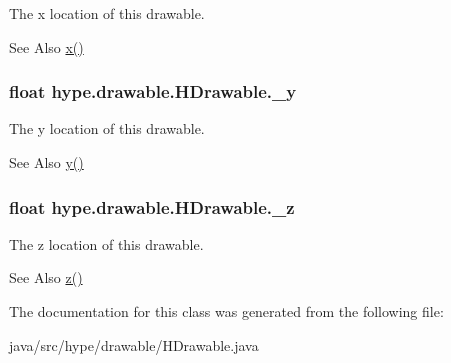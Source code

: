 The x location of this drawable. 

\begin{DoxySeeAlso}{See Also}
\hyperlink{classhype_1_1drawable_1_1_h_drawable_a5d15bcfcf4b2f28f463340a891c03723}{x()} 
\end{DoxySeeAlso}
\hypertarget{classhype_1_1drawable_1_1_h_drawable_a42f6ddcf3b67293eab4d61d08eccbd5c}{
\subsubsection[{\-\_\-y}]{\setlength{\rightskip}{0pt plus 5cm}float hype.\-drawable.\-H\-Drawable.\-\_\-y\hspace{0.3cm}{\ttfamily [protected]}}}\label{classhype_1_1drawable_1_1_h_drawable_a42f6ddcf3b67293eab4d61d08eccbd5c}


The y location of this drawable. 

\begin{DoxySeeAlso}{See Also}
\hyperlink{classhype_1_1drawable_1_1_h_drawable_a30c54761208704a922b0acdfd40ca8d1}{y()} 
\end{DoxySeeAlso}
\hypertarget{classhype_1_1drawable_1_1_h_drawable_a3d0f13d023b008b211fdb60a87ade649}{
\subsubsection[{\-\_\-z}]{\setlength{\rightskip}{0pt plus 5cm}float hype.\-drawable.\-H\-Drawable.\-\_\-z\hspace{0.3cm}{\ttfamily [protected]}}}\label{classhype_1_1drawable_1_1_h_drawable_a3d0f13d023b008b211fdb60a87ade649}


The z location of this drawable. 

\begin{DoxySeeAlso}{See Also}
\hyperlink{classhype_1_1drawable_1_1_h_drawable_ababc3566a7431aa4dfe0ce755894e502}{z()} 
\end{DoxySeeAlso}


The documentation for this class was generated from the following file\-:\begin{DoxyCompactItemize}
\item 
java/src/hype/drawable/H\-Drawable.\-java\end{DoxyCompactItemize}
